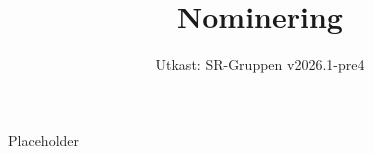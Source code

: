 \documentclass[a4paper]{dtek}
\title{Nominering}
\date{Utkast: SR-Gruppen v2026.1-pre4}
\begin{document}
Placeholder
\end{document}
